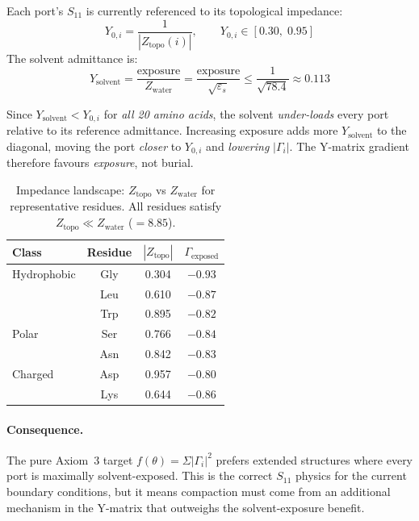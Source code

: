 Each port's $S_{11}$ is currently referenced to its topological
impedance:
\begin{equation}
    Y_{0,i} = \frac{1}{|Z_\text{topo}(i)|}, \qquad
    Y_{0,i} \in [0.30,\; 0.95]
\end{equation}
The solvent admittance is:
\begin{equation}
    Y_\text{solvent} = \frac{\text{exposure}}{Z_\text{water}}
    = \frac{\text{exposure}}{\sqrt{\varepsilon_s}}
    \leq \frac{1}{\sqrt{78.4}} \approx 0.113
\end{equation}

Since $Y_\text{solvent} < Y_{0,i}$ for \emph{all 20 amino acids}, the
solvent \emph{under-loads} every port relative to its reference
admittance.  Increasing exposure adds more $Y_\text{solvent}$ to the
diagonal, moving the port \emph{closer} to $Y_{0,i}$ and \emph{lowering}
$|\Gamma_i|$.  The Y-matrix gradient therefore favours \emph{exposure},
not burial.

\begin{table}[H]
\centering
\caption{Impedance landscape: $Z_\text{topo}$ vs $Z_\text{water}$ for
representative residues.  All residues satisfy
$Z_\text{topo} \ll Z_\text{water}$ ($=8.85$).}
\label{tab:impedance_landscape}
\small
\begin{tabular}{@{}l c c c@{}}
\toprule
\textbf{Class} & \textbf{Residue} & $|Z_\text{topo}|$ & $\Gamma_\text{exposed}$ \\
\midrule
Hydrophobic & Gly & 0.304 & $-0.93$ \\
            & Leu & 0.610 & $-0.87$ \\
            & Trp & 0.895 & $-0.82$ \\
Polar       & Ser & 0.766 & $-0.84$ \\
            & Asn & 0.842 & $-0.83$ \\
Charged     & Asp & 0.957 & $-0.80$ \\
            & Lys & 0.644 & $-0.86$ \\
\bottomrule
\end{tabular}
\end{table}

\paragraph{Consequence.}
The pure Axiom~3 target $f(\theta) = \Sigma|\Gamma_i|^2$ prefers
extended structures where every port is maximally solvent-exposed.
This is the correct $S_{11}$ physics for the current boundary
conditions, but it means compaction must come from an additional
mechanism in the Y-matrix that outweighs the solvent-exposure benefit.

